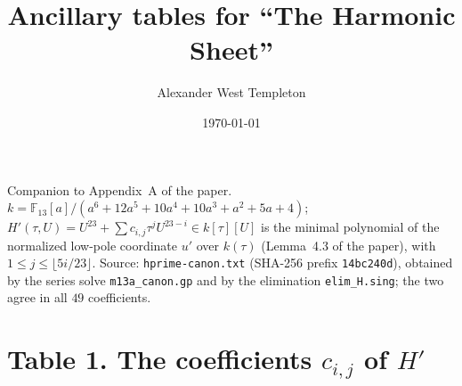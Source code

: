 \documentclass[11pt]{amsart}
\title{Ancillary tables for ``The Harmonic Sheet''}
\author{Alexander West Templeton}
\date{\today}
\begin{document}
\maketitle
\noindent Companion to Appendix~A of the paper. $k=\mathbb F_{13}[a]/(a^6+12a^5+10a^4+10a^3+a^2+5a+4)$;
$H'(\tau,U)=U^{23}+\sum c_{i,j}\tau^jU^{23-i}\in k[\tau][U]$ is the minimal polynomial of the
normalized low-pole coordinate $u'$ over $k(\tau)$ (Lemma~4.3 of the paper), with
$1\le j\le\lfloor5i/23\rfloor$. Source: \texttt{hprime-canon.txt} (SHA-256 prefix \texttt{14bc240d}),
obtained by the series solve \texttt{m13a\_canon.gp} and by the elimination \texttt{elim\_H.sing};
the two agree in all $49$ coefficients.

\section*{Table 1. The coefficients $c_{i,j}$ of $H'$}
\end{document}
